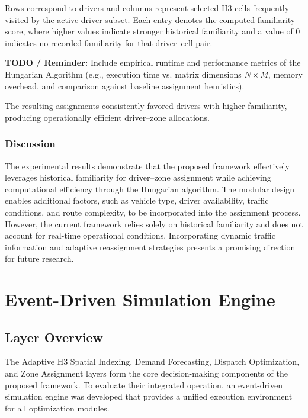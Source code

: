 \documentclass{article}
\begin{document}
Rows correspond to drivers and columns represent selected H3 cells frequently visited by the active driver subset. Each entry denotes the computed familiarity score, where higher values indicate stronger historical familiarity and a value of 0 indicates no recorded familiarity for that driver--cell pair.

\begin{blockquote}
\textbf{TODO / Reminder:} Include empirical runtime and performance metrics of the Hungarian Algorithm (e.g., execution time vs. matrix dimensions $N \times M$, memory overhead, and comparison against baseline assignment heuristics).
\end{blockquote}

The resulting assignments consistently favored drivers with higher familiarity, producing operationally efficient driver--zone allocations.




\subsubsection{Discussion}
The experimental results demonstrate that the proposed framework effectively leverages historical familiarity for driver–zone assignment while achieving computational efficiency through the Hungarian algorithm. The modular design enables additional factors, such as vehicle type, driver availability, traffic conditions, and route complexity, to be incorporated into the assignment process. However, the current framework relies solely on historical familiarity and does not account for real-time operational conditions. Incorporating dynamic traffic information and adaptive reassignment strategies presents a promising direction for future research.

\section{Event-Driven Simulation Engine}
\label{sec:event_driven_simulation_engine}

\subsection{Layer Overview}
\label{subsec:simulation_layer_overview}

The Adaptive H3 Spatial Indexing, Demand Forecasting, Dispatch Optimization, and Zone Assignment layers form the core decision-making components of the proposed framework. To evaluate their integrated operation, an event-driven simulation engine was developed that provides a unified execution environment for all optimization modules.
\end{document}
